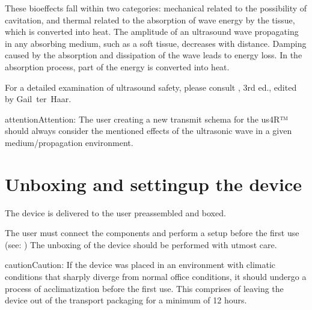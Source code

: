 \documentclass[letterpaper,10pt,english]{sphinxmanual}
\begin{document}
\sphinxAtStartPar
These bio\sphinxhyphen{}effects fall within two categories: mechanical \textendash{} related to
the possibility of cavitation, and thermal \textendash{} related to the absorption
of wave energy by the tissue, which is converted into heat. The
amplitude of an ultrasound wave propagating in any absorbing medium,
such as a soft tissue, decreases with distance. Damping caused by the
absorption and dissipation of the wave leads to energy loss. In the
absorption process, part of the energy is converted into heat.

\sphinxAtStartPar
For a detailed examination of ultrasound safety, please consult , 3rd ed., edited by Gail ter Haar.

\begin{sphinxadmonition}{attention}{Attention:}
\sphinxAtStartPar
The user creating a new transmit schema for the us4R™ should always consider the mentioned effects of the ultrasonic wave in a given medium/propagation environment.
\end{sphinxadmonition}

\sphinxstepscope


\chapter{Unboxing and setting\sphinxhyphen{}up the device}
\label{\detokenize{content/set-up:unboxing-and-setting-up-the-device}}\label{\detokenize{content/set-up::doc}}
\sphinxAtStartPar
The device is delivered to the user pre\sphinxhyphen{}assembled and boxed.

\sphinxAtStartPar
The user must connect the components and perform a setup before the
first use (see: {\hyperref[\detokenize{content/set-up:-system-setup}]{}}) The unboxing of the device should
be performed with utmost care.

\begin{sphinxadmonition}{caution}{Caution:}
\sphinxAtStartPar
If the device was placed in an environment with climatic conditions that sharply diverge from normal office conditions, it should undergo a process of acclimatization before the first use. This comprises of leaving the device out of the transport packaging for a minimum of 12 hours.
\end{sphinxadmonition}
\end{document}
